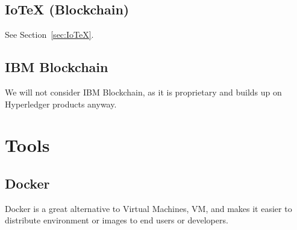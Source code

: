 \subsection{IoTeX (Blockchain)} %
\label{sub:IoTeX-Blockchain}
See Section~\ref{sec:IoTeX}.

\subsection{IBM Blockchain} %
\label{sub:IBM-Blockchain}
We will not consider IBM Blockchain, as it is proprietary and builds up on Hyperledger products anyway.


\section{Tools} %
\label{sec:Tools}
\subsection{Docker} %
\label{sub:Docker}
Docker is a great alternative to Virtual Machines, VM, and makes it easier to distribute environment or images to end
users or developers.
